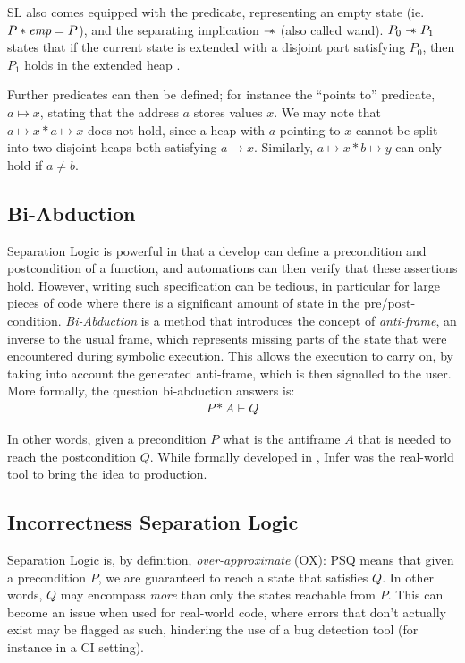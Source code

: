 SL also comes equipped with the \emp{} predicate, representing an empty state (ie. $P * \textit{emp} = P$), and the separating implication $\mathrel{-\!\!\ast}$ (also called wand). $P_0 \mathrel{-\!\!\ast} P_1$ states that if the current state is extended with a disjoint part satisfying $P_0$, then $P_1$ holds in the extended heap \cite{seplogic2}.

Further predicates can then be defined; for instance the ``points to'' predicate, $a \mapsto x$, stating that the address $a$ stores values $x$. We may note that $a \mapsto x * a \mapsto x$ does not hold, since a heap with $a$ pointing to $x$ cannot be split into two disjoint heaps both satisfying $a \mapsto x$. Similarly, $a\mapsto x * b \mapsto y$ can only hold if $a\neq b$.

\subsection{Bi-Abduction}

Separation Logic is powerful in that a develop can define a precondition and postcondition of a function, and automations can then verify that these assertions hold. However, writing such specification can be tedious, in particular for large pieces of code where there is a significant amount of state in the pre/post-condition. \emph{Bi-Abduction} \cite{biabduction} is a method that introduces the concept of \emph{anti-frame}, an inverse to the usual frame, which represents missing parts of the state that were encountered during symbolic execution. This allows the execution to carry on, by taking into account the generated anti-frame, which is then signalled to the user. More formally, the question bi-abduction answers is:
\begin{align*}
	P * A \vdash Q
\end{align*}

In other words, given a precondition $P$ what is the antiframe $A$ that is needed to reach the postcondition $Q$. While formally developed in \cite{biabduction}, Infer \cite{infer} was the real-world tool to bring the idea to production.

\subsection{Incorrectness Separation Logic}

Separation Logic is, by definition, \emph{over-approximate} (OX): \SLtriple PSQ means that given a precondition $P$, we are guaranteed to reach a state that satisfies $Q$. In other words, $Q$ may encompass \emph{more} than only the states reachable from $P$. This can become an issue when used for real-world code, where errors that don't actually exist may be flagged as such, hindering the use of a bug detection tool (for instance in a CI setting).

